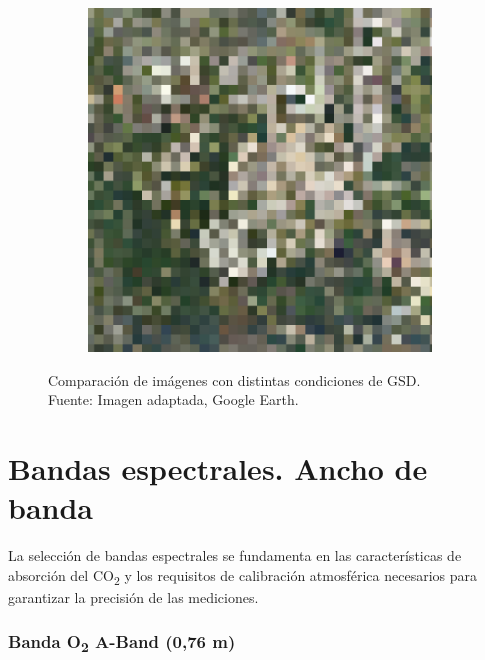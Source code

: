 \begin{figure}[H]
\begin{subfigure}[b]{0.3\textwidth}
    \end{subfigure}
    \hfill
    \begin{subfigure}[b]{0.3\textwidth}
        \includegraphics[width=\textwidth]{4.Payload/Houston GSD200.jpg}
    \end{subfigure}

    \caption{Comparación de imágenes con distintas condiciones de GSD. \\Fuente: Imagen adaptada, Google Earth.}
    \label{fig:comparacion_gsd}
\end{figure}


\section{Bandas espectrales. Ancho de banda} \label{sec:specbands}

La selección de bandas espectrales se fundamenta en las características de absorción del CO\textsubscript{2} y los requisitos de calibración atmosférica necesarios para garantizar la precisión de las mediciones.

\subsubsection{Banda O\textsubscript{2} A-Band (0,76 \textmu m)}

